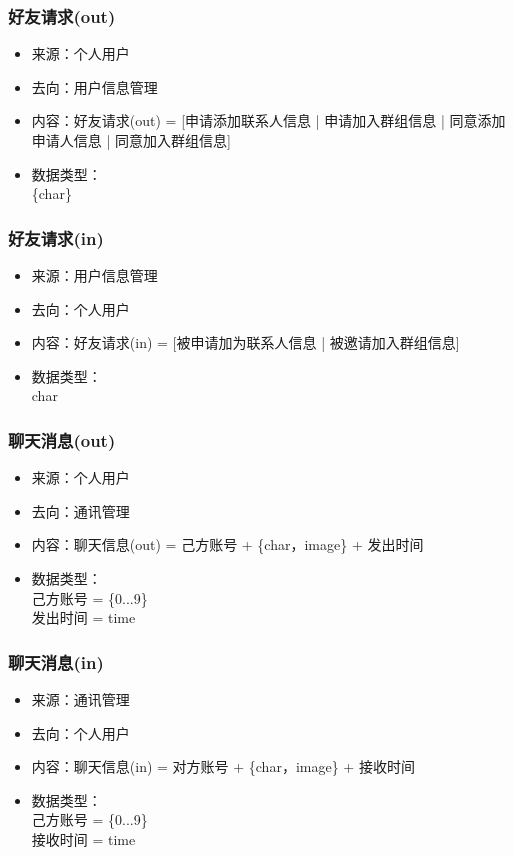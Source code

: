             \subsubsection{好友请求(out)}
            \begin{itemize}
                \item 来源：个人用户
                \item 去向：用户信息管理
                \item 内容：好友请求(out) = [申请添加联系人信息 | 申请加入群组信息 | 同意添加申请人信息 | 同意加入群组信息]
                \item 数据类型：\\
                \{char\}\\
            \end{itemize}
                \subsubsection{好友请求(in)}
                \begin{itemize}
                    \item 来源：用户信息管理
                    \item 去向：个人用户
                    \item 内容：好友请求(in) = [被申请加为联系人信息 | 被邀请加入群组信息]
                    \item 数据类型：\\{char}
            \end{itemize}
            \subsubsection{聊天消息(out)}
            \begin{itemize}
                \item 来源：个人用户
                \item 去向：通讯管理
                \item 内容：聊天信息(out) = 己方账号 + \{char，image\} + 发出时间
                \item 数据类型：\\己方账号 = \{0...9\}\\
                         发出时间 = time
            \end{itemize}
            \subsubsection{聊天消息(in)}
            \begin{itemize}
                \item 来源：通讯管理
                \item 去向：个人用户
                \item 内容：聊天信息(in) = 对方账号 + \{char，image\} + 接收时间
                \item 数据类型：\\
                己方账号 = \{0...9\}\\
                接收时间 = time\\
            \end{itemize}

